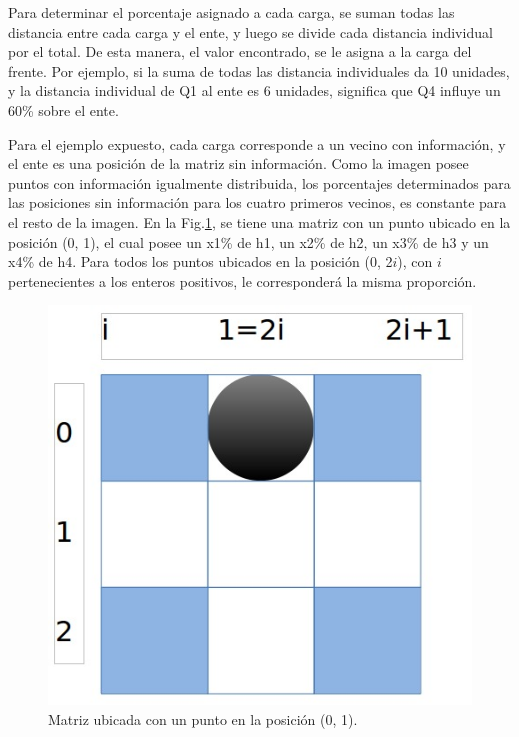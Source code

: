 Para determinar el porcentaje asignado a cada carga, se suman todas
las distancia entre cada carga y el ente, y luego se divide cada
distancia individual por el total. De esta manera, el valor
encontrado, se le asigna a la carga del frente. Por ejemplo, si la
suma de todas las distancia individuales da 10 unidades, y la
distancia individual de Q1 al ente es 6 unidades, significa que Q4
influye un 60\% sobre el ente.

Para el ejemplo expuesto, cada carga corresponde a un vecino con
información, y el ente es una posición de la matriz sin información.
Como la imagen posee puntos con información igualmente distribuida,
los porcentajes determinados para las posiciones sin información para
los cuatro primeros vecinos, es constante para el resto de la imagen.
En la Fig.\ref{img:m01}, se tiene una matriz con un punto ubicado en
la posición (0, 1), el cual posee un x1\% de h1, un x2\% de h2, un
x3\% de h3 y un x4\% de h4. Para todos los puntos ubicados en la
posición (0, 2$i$), con $i$ pertenecientes a los enteros positivos, le
corresponderá la misma proporción.

\begin{figure}[hb!]
  \begin{center}
    \includegraphics[scale=.5]{image/m01}
  \end{center}
  \caption{Matriz ubicada con un punto en la posición (0, 1).}\label{img:m01}
\end{figure}


